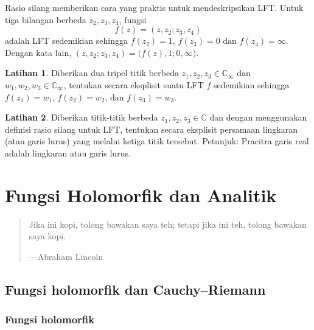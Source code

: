 \documentclass[12pt,openany]{book}
\newcommand{\C}{{\mathbb{C}}}
\theoremstyle{plain}
\theoremstyle{remark}
\theoremstyle{definition}
\newenvironment{exbox}{%
    \def\FrameCommand{\vrule width 1pt \relax\hspace{10pt}}%
    \MakeFramed{\advance\hsize-\width\FrameRestore}%
}{%
    \endMakeFramed
}
\newenvironment{myepigraph}{%
    \begin{quote}%
    \begingroup\itshape
}{%
    \endgroup%
    \end{quote}
}
\theoremstyle{exercise}
\newtheorem{exercise}{Latihan}[section]
\theoremstyle{example}
\begin{document}
Rasio silang memberikan cara yang praktis untuk mendeskripsikan LFT.
Untuk tiga bilangan berbeda $z_2,z_3,z_4$, fungsi
\begin{equation*}
f(z) =
(z,z_2;z_3,z_4)
\end{equation*}
adalah LFT sedemikian sehingga $f(z_2) = 1$, $f(z_3)=0$ dan $f(z_4) = \infty$.
Dengan kata lain,
$(z,z_2;z_3,z_4) = 
\bigl(f(z),1;0,\infty\bigr)$.

\begin{exbox}
\begin{exercise}
Diberikan dua tripel titik berbeda $z_1,z_2,z_3 \in \C_\infty$
dan $w_1,w_2,w_3 \in \C_\infty$, tentukan secara eksplisit suatu LFT $f$
sedemikian sehingga
$f(z_1) = w_1$,
$f(z_2) = w_2$, dan
$f(z_3) = w_3$.
\end{exercise}

\begin{exercise}
Diberikan titik-titik berbeda $z_1,z_2,z_3 \in \C$ dan
dengan menggunakan definisi rasio silang untuk LFT\@, tentukan secara eksplisit
persamaan lingkaran (atau garis lurus) yang melalui ketiga titik tersebut.
Petunjuk: Pracitra garis real adalah lingkaran atau garis lurus.
\end{exercise}
\end{exbox}


\chapter{Fungsi Holomorfik dan Analitik} \label{ch:holanal}

\begin{myepigraph}
Jika ini kopi, tolong bawakan saya teh; tetapi jika ini teh, tolong bawakan saya kopi.

---Abraham Lincoln
\end{myepigraph}


\section{Fungsi holomorfik dan Cauchy--Riemann}
\label{sec:holfuncs}

\subsection{Fungsi holomorfik}
\end{document}
